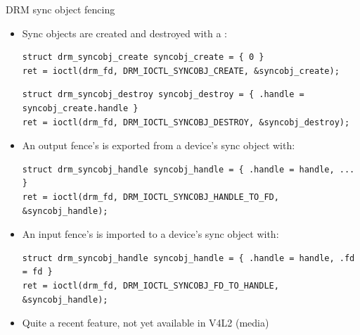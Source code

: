 \begin{frame}[fragile]{DRM sync object fencing}
  \begin{itemize}
  \item Sync objects are created and destroyed with a :
  \begin{verbatim}
struct drm_syncobj_create syncobj_create = { 0 }
ret = ioctl(drm_fd, DRM_IOCTL_SYNCOBJ_CREATE, &syncobj_create);
  \end{verbatim}
  \begin{verbatim}
struct drm_syncobj_destroy syncobj_destroy = { .handle = syncobj_create.handle }
ret = ioctl(drm_fd, DRM_IOCTL_SYNCOBJ_DESTROY, &syncobj_destroy);
  \end{verbatim}
  \item An output fence's  is exported from a device's sync object with:
  \begin{verbatim}
struct drm_syncobj_handle syncobj_handle = { .handle = handle, ... }
ret = ioctl(drm_fd, DRM_IOCTL_SYNCOBJ_HANDLE_TO_FD, &syncobj_handle);
  \end{verbatim}
  \item An input fence's  is imported to a device's sync object with:
  \begin{verbatim}
struct drm_syncobj_handle syncobj_handle = { .handle = handle, .fd = fd }
ret = ioctl(drm_fd, DRM_IOCTL_SYNCOBJ_FD_TO_HANDLE, &syncobj_handle);
  \end{verbatim}
  \item Quite a recent feature, not yet available in V4L2 (media)
  \end{itemize}
\end{frame}

